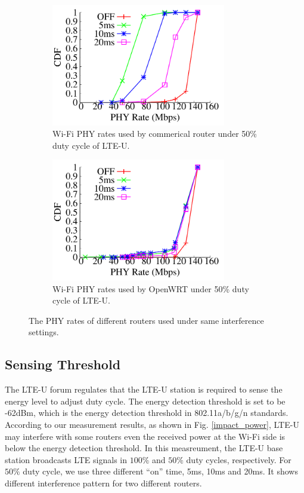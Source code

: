 \begin{figure}[t] \centering
    \begin{subfigure}[b]{\linewidth} \centering
     \includegraphics[width=3.0in, angle=0]{./figures/impact_ratecdf_tplink} 
         \vspace{-0.0cm}
         \caption{Wi-Fi PHY rates used by commerical router under 50\% duty cycle of LTE-U.}         
        \label{impact_cdfrate:a}
    \end{subfigure} %

    \begin{subfigure}[b]{\linewidth} \centering 
     \includegraphics[width=3.0in, angle=0]{./figures/impact_ratecdf_openwrt}  
        \vspace{-0.0cm}
        \caption{Wi-Fi PHY rates used by OpenWRT under 50\% duty cycle of LTE-U.}
        \label{impact_cdfrate:b}    
    \end{subfigure} 
\caption{The PHY rates of different routers used under same interference settings.}
\label{impact_cdfrate}
\vspace{-0.2cm}
\end{figure}




\subsection{Sensing Threshold}


The LTE-U forum regulates that the LTE-U station is required to sense the energy level
to adjust duty cycle. 
The energy detection threshold is set to be -62dBm, 
which is the energy detection threshold in 802.11a/b/g/n standards. 
According to our measurement results, as shown in Fig. \ref{impact_power},
LTE-U may interfere with some routers even the 
received power at the Wi-Fi side is below the energy detection threshold.
In this measreument, 
the LTE-U base station broadcasts LTE signals in $100\%$ and $50\%$ duty cycles, respectively. 
For $50\%$ duty cycle, we use three different ``on'' time, 5ms, 10ms and 20ms.
It shows different interference pattern for two different routers. 



